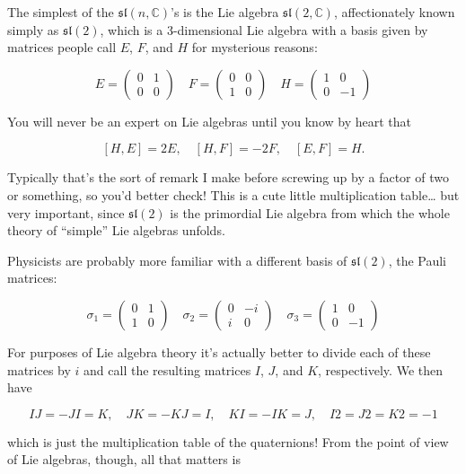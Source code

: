 \documentclass{article}
\begin{document}
The simplest of the \(\mathfrak{sl}(n,\mathbb{C})\)'s is the Lie algebra
\(\mathfrak{sl}(2,\mathbb{C})\), affectionately known simply as
\(\mathfrak{sl}(2)\), which is a 3-dimensional Lie algebra with a basis
given by matrices people call \(E\), \(F\), and \(H\) for mysterious
reasons:

\[E=\left(\begin{array}{cc}0&1\\0&0\end{array}\right) \quad F=\left(\begin{array}{cc}0&0\\1&0\end{array}\right) \quad H=\left(\begin{array}{cc}1&0\\0&-1\end{array}\right)\]

You will never be an expert on Lie algebras until you know by heart that

\[[H,E] = 2E, \quad [H,F] = -2F, \quad [E,F]  = H.\]

Typically that's the sort of remark I make before screwing up by a
factor of two or something, so you'd better check! This is a cute little
multiplication table\ldots{} but very important, since
\(\mathfrak{sl}(2)\) is the primordial Lie algebra from which the whole
theory of ``simple'' Lie algebras unfolds.

Physicists are probably more familiar with a different basis of
\(\mathfrak{sl}(2)\), the Pauli matrices:

\[\sigma_1=\left(\begin{array}{cc}0&1\\1&0\end{array}\right) \quad \sigma_2=\left(\begin{array}{cc}0&-i\\i&0\end{array}\right) \quad \sigma_3=\left(\begin{array}{cc}1&0\\0&-1\end{array}\right)\]

For purposes of Lie algebra theory it's actually better to divide each
of these matrices by \(i\) and call the resulting matrices \(I\), \(J\),
and \(K\), respectively. We then have

\[IJ = -JI = K, \quad JK = -KJ = I, \quad KI = -IK = J, \quad I2 = J2 = K2 = -1\]

which is just the multiplication table of the quaternions! From the
point of view of Lie algebras, though, all that matters is
\end{document}

